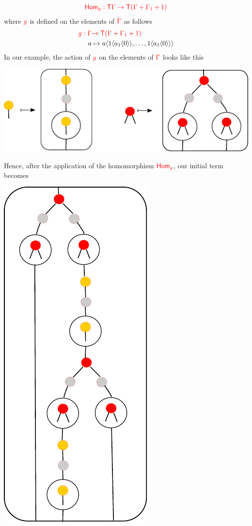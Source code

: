 \begin{example}
\begin{enumerate}
\begin{align*}
{\color{red}{\mathsf{Hom}_g:{\color{red}{\mathsf T}}\Gamma\to {\color{red}{\mathsf T}}(\Gamma+\Gamma_1+1)}}
\end{align*}
where ${\color{red}{g}}$ is defined on the elements of ${\color{red}{\Gamma}}$ as follows
\begin{align*}
{\color{red}{g: \Gamma}} & {\color{red}{\to  {\color{red}{\mathsf T}}(\Gamma+\Gamma_1+1 )}}\\
      a & \mapsto a\langle{1\langle{a_1\langle{0}\rangle}\rangle,\dots, 1\langle{a_1\langle{0}\rangle}\rangle}\rangle
\end{align*}
In our example, the action of ${\color{red}{g}}$ on the elements of ${\color{red}{\Gamma}}$ looks like this
\begin{center}
		\includegraphics[scale=.5]{parent-3.pdf}
				\end{center}
Hence, after the application of the homomorphism ${\color{red}{\mathsf{Hom}_g}}$, our initial term becomes
\begin{center}
		\includegraphics[scale=.5]{parent-4.pdf}

\end{center}
\end{enumerate}
\end{example}
